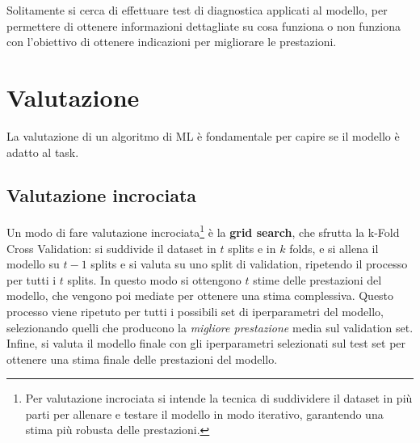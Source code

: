 Solitamente si cerca di effettuare test di diagnostica applicati al modello, per permettere di ottenere informazioni dettagliate su cosa funziona o non funziona con l'obiettivo di ottenere indicazioni per migliorare le prestazioni.

\section{Valutazione}
La valutazione di un algoritmo di ML è fondamentale per capire se il modello è adatto al task. 

\subsection{Valutazione incrociata}
Un modo di fare valutazione incrociata\footnote{Per valutazione incrociata si intende la tecnica di suddividere il dataset in più parti per allenare e testare il modello in modo iterativo, garantendo una stima più robusta delle prestazioni.} è la \textbf{grid search}, che sfrutta la k-Fold Cross Validation: si suddivide il dataset in $t$ splits e in $k$ folds, e si allena il modello su $t-1$ splits e si valuta su uno split di validation, ripetendo il processo per tutti i $t$ splits. In questo modo si ottengono $t$ stime delle prestazioni del modello, che vengono poi mediate per ottenere una stima complessiva. Questo processo viene ripetuto per tutti i possibili set di iperparametri del modello, selezionando quelli che producono la \emph{migliore prestazione} media sul validation set. Infine, si valuta il modello finale con gli iperparametri selezionati sul test set per ottenere una stima finale delle prestazioni del modello.

